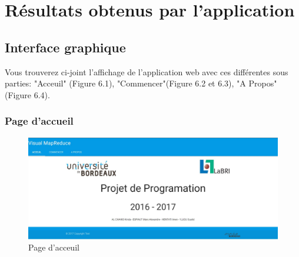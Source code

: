 \chapter{Résultats obtenus par l'application}

\section{Interface graphique}
Vous trouverez ci-joint l'affichage de l'application web avec ces différentes sous parties: "Acceuil" (Figure 6.1), "Commencer"(Figure 6.2 et 6.3), "A Propos" (Figure 6.4).
\subsection{Page d'accueil}
\begin{figure}[H]
  \centering
    \includegraphics[scale=0.4]{images/resultat_acceuil.jpg}
        \caption{Page d'acceuil}
\end{figure}
